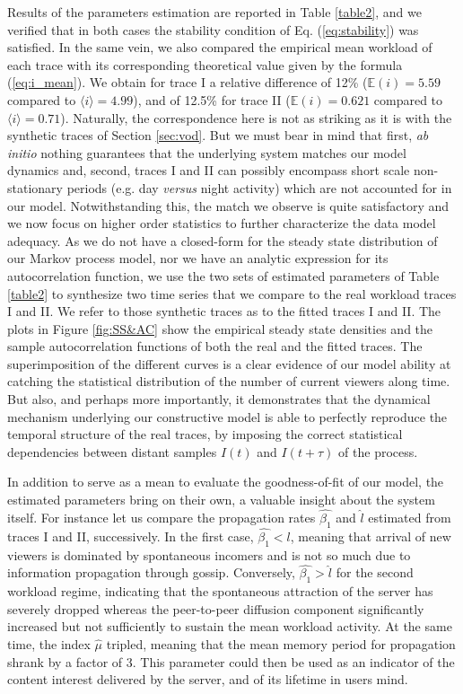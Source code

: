 \documentclass[twoside]{article}
\begin{document}
Results of the parameters estimation are reported in Table \ref{table2}, and we verified that in both cases the stability condition of Eq. (\ref{eq:stability}) was satisfied. In the same vein, we also compared the empirical mean workload of each trace with its corresponding theoretical value given by the formula (\ref{eq:i_mean}). We obtain for trace I a relative difference of 12\% ($\mathbb{E}(i) = 5.59$ compared to $\langle i \rangle = 4.99$), and of 12.5\% for trace II ($\mathbb{E}(i) = 0.621$ compared to $\langle i \rangle = 0.71$). Naturally, the correspondence here is not as striking as it is with the synthetic traces of Section \ref{sec:vod}. But we must bear in mind that first, {\em ab initio} nothing guarantees that  the underlying system matches our model dynamics and, second, traces I and II can possibly encompass short scale non-stationary periods (e.g. day {\em versus} night activity) which are not accounted for in our model. Notwithstanding this, the match we observe is quite satisfactory and we now focus on higher order statistics to further characterize the data model adequacy. As we do not have a closed-form for the steady state distribution of our Markov process model, nor we have an analytic expression for its autocorrelation function, we use the two sets of  estimated parameters of Table \ref{table2} to synthesize two time series that we compare to the real workload traces I and II. We refer to those synthetic traces as to the fitted traces I and II. The plots in Figure \ref{fig:SS&AC} show the empirical steady state densities and the sample autocorrelation functions of both the real and the fitted traces. The superimposition of the different curves is a clear evidence of our model ability at catching the statistical distribution of the number of current viewers along time. But also, and perhaps more importantly, it demonstrates that the dynamical mechanism underlying our constructive model is able to perfectly reproduce the temporal structure of the real traces, by imposing the correct statistical dependencies between distant samples $I(t)$ and $I(t+\tau)$ of the process.


In addition to serve as a mean to evaluate the goodness-of-fit of our model, the estimated parameters bring on their own, a valuable insight about the system itself. For instance let us compare the propagation rates $\widehat{\beta_1}$ and $\widehat{l}$ estimated from traces I and II, successively. In the first case, $\widehat{\beta_1} < l$, meaning that arrival of new viewers is dominated by spontaneous incomers and is not so much due to information propagation through gossip. Conversely, $\widehat{\beta_1} > \widehat{l}$ for the second workload regime, indicating that the spontaneous attraction of the server has severely dropped whereas the peer-to-peer diffusion component significantly increased but not sufficiently to sustain the mean workload activity. At the same time, the index $\widehat{\mu}$ tripled, meaning that the mean memory period for propagation shrank by a factor of 3. This parameter could then be used as an indicator of the content interest delivered by the server, and of its lifetime in users mind.
\end{document}
